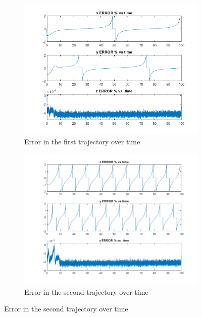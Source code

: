 \documentclass[conf]{new-aiaa}
\begin{document}
\begin{doublespace}
\begin{singlespace}
\begin{figure}[!htpb]
\begin{subfigure}{.5\textwidth}
  \centering
  \includegraphics[scale= 0.6]{LQGhelix_1_err.png}
  \caption{Error in the first trajectory over time}
  \label{LQGhelix_err1}
\end{subfigure}%
\begin{subfigure}{.5\textwidth}
  \centering
  \includegraphics[scale= 0.5]{LQGhelix_2_err.png}
  \caption{Error in the second trajectory over time}
  \label{LQGhelix_err2}
\end{subfigure}%
\end{figure}



\end{singlespace}
\end{doublespace}
\end{document}
